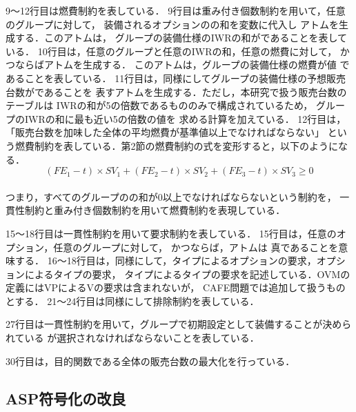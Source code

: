 9〜12行目は燃費制約を表している．
9行目は重み付き個数制約を用いて，任意のグループに対して，
装備されるオプションのの和を変数に代入し
アトムを生成する．このアトムは，
グループの装備仕様のIWRの和がであることを表している．
%
10行目は，任意のグループと任意のIWRの和，任意の燃費に対して，
かつならばアトムを生成する．
このアトムは，グループの装備仕様の燃費が値
であることを表している．
%
11行目は，同様にしてグループの装備仕様の予想販売台数がであることを
表すアトムを生成する．ただし，本研究で扱う販売台数のテーブルは
IWRの和が5の倍数であるもののみで構成されているため，
グループのIWRの和に最も近い5の倍数の値を
求める計算を加えている．
%
12行目は，「販売台数を加味した全体の平均燃費が基準値以上でなければならない」
という燃費制約を表している．第2節の燃費制約の式を変形すると，以下のようになる．
\\
\begin{displaymath}
 (FE_{1} - t) \times SV_{1} + (FE_{2} - t) \times SV_{2} + (FE_{3} - t)
 \times SV_{3} \geq 0
\end{displaymath}
\\
つまり，すべてのグループのの和が0以上でなければならないという制約を，
一貫性制約と重み付き個数制約を用いて燃費制約を表現している．

15〜18行目は一貫性制約を用いて要求制約を表している．
15行目は，任意のオプション，任意のグループに対して，
かつならば，アトムは
真であることを意味する．
16〜18行目は，同様にして，タイプによるオプションの要求，オプションによるタイプの要求，
タイプによるタイプの要求を記述している．OVMの定義にはVPによるVの要求は含まれないが，
CAFE問題では追加して扱うものとする．
21〜24行目は同様にして排除制約を表している．

27行目は一貫性制約を用いて，グループで初期設定として装備することが決められている
が選択されなければならないことを表している．

30行目は，目的関数である全体の販売台数の最大化を行っている．



\subsection{ASP符号化の改良}
 

